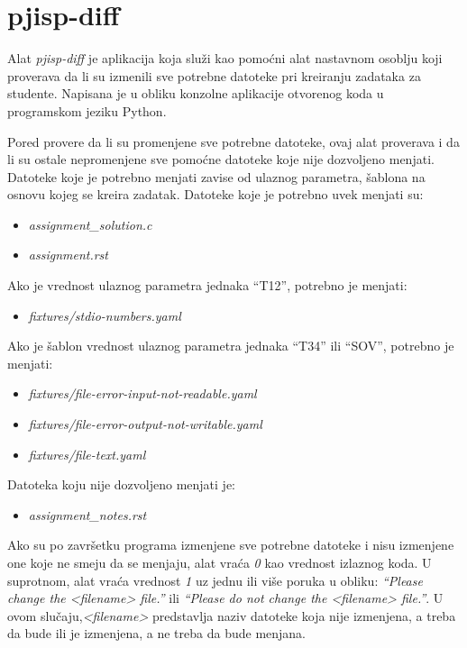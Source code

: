\documentclass[12pt]{report}
\begin{document}
\section{pjisp-diff}

Alat \textit{pjisp-diff} \cite{pjisp-diff} je aplikacija koja služi kao pomoćni alat nastavnom osoblju koji proverava da li su izmenili sve potrebne datoteke pri kreiranju zadataka za studente. Napisana je u obliku konzolne aplikacije otvorenog koda u programskom jeziku Python.

Pored provere da li su promenjene sve potrebne datoteke, ovaj alat proverava i da li su ostale nepromenjene sve pomoćne datoteke koje nije dozvoljeno menjati. Datoteke koje je potrebno menjati zavise od ulaznog parametra, šablona na osnovu kojeg se kreira zadatak. Datoteke koje je potrebno uvek menjati su:

\begin{itemize}
    \item \textit{assignment\_solution.c}
    \item \textit{assignment.rst}
\end{itemize}

Ako je vrednost ulaznog parametra jednaka ``T12'', potrebno je menjati:

\begin{itemize}
    \item \textit{fixtures/stdio-numbers.yaml}
\end{itemize}

Ako je šablon vrednost ulaznog parametra jednaka ``T34'' ili ``SOV'', potrebno je menjati:

\begin{itemize}
    \item \textit{fixtures/file-error-input-not-readable.yaml}
    \item \textit{fixtures/file-error-output-not-writable.yaml}
    \item \textit{fixtures/file-text.yaml}
\end{itemize}

Datoteka koju nije dozvoljeno menjati je:

\begin{itemize}
    \item \textit{assignment\_notes.rst}
\end{itemize}

Ako su po završetku programa izmenjene sve potrebne datoteke i nisu izmenjene one koje ne smeju da se menjaju, alat vraća \textit{0} kao vrednost izlaznog koda. U suprotnom, alat vraća vrednost \textit{1} uz jednu ili više poruka u obliku: \textit{``Please change the <filename> file.''} ili \textit{``Please do not change the <filename> file.''}. U ovom slučaju,\textit{<filename>} predstavlja naziv datoteke koja nije izmenjena, a treba da bude ili je izmenjena, a ne treba da bude menjana.
\end{document}
